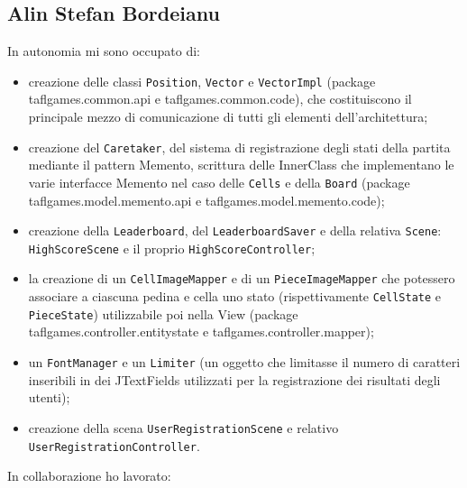 \documentclass[a4paper,12pt]{report}
\begin{document}
\subsection{Alin Stefan Bordeianu}
In autonomia mi sono occupato di:
\begin{itemize}
	\item creazione delle classi \texttt{Position}, \texttt{Vector} e \texttt{VectorImpl} (package taflgames.common.api e taflgames.common.code), che costituiscono il principale mezzo di comunicazione di tutti gli elementi dell'architettura;
	
	\item creazione del \texttt{Caretaker}, del sistema di registrazione degli stati della partita mediante il pattern Memento, scrittura delle InnerClass che implementano le varie interfacce Memento nel caso delle \texttt{Cells} e della \texttt{Board} (package taflgames.model.memento.api e taflgames.model.memento.code);
	
	\item creazione della \texttt{Leaderboard}, del \texttt{LeaderboardSaver} e della relativa \texttt{Scene}: \texttt{HighScoreScene} e il proprio \texttt{HighScoreController};
	
	\item la creazione di un \texttt{CellImageMapper} e di un \texttt{PieceImageMapper} che potessero associare a ciascuna pedina e cella uno stato (rispettivamente \texttt{CellState} e \texttt{PieceState}) utilizzabile poi nella View (package taflgames.controller.entitystate e taflgames.controller.mapper);
	
	\item un \texttt{FontManager} e un \texttt{Limiter} (un oggetto che limitasse il numero di caratteri inseribili in dei JTextFields utilizzati per la registrazione dei risultati degli utenti);
	
	\item creazione della scena \texttt{UserRegistrationScene} e relativo \texttt{UserRegistrationController}.
\end{itemize}
In collaborazione ho lavorato:
\end{document}
